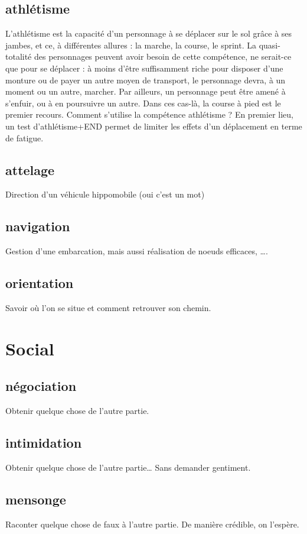 \documentclass[10pt,a4paper,twocolumn]{book}
\begin{document}
\subsection*{athlétisme}
L’athlétisme est la capacité d’un personnage à se déplacer sur le sol grâce à ses jambes, et ce, à différentes allures : la marche, la course, le sprint. La quasi-totalité des personnages peuvent avoir besoin de cette compétence, ne serait-ce que pour se déplacer : à moins d’être suffisamment riche pour disposer d’une monture ou de payer un autre moyen de transport, le personnage devra, à un moment ou un autre, marcher. Par ailleurs, un personnage peut être amené à s’enfuir, ou à en poursuivre un autre. Dans ces cas-là, la course à pied est le premier recours.
Comment s’utilise la compétence athlétisme ?
En premier lieu, un test d’athlétisme+END permet de limiter les effets d’un déplacement en terme de fatigue.

\subsection*{attelage}
Direction d’un véhicule hippomobile (oui c’est un mot)
\subsection*{navigation}
Gestion d’une embarcation, mais aussi réalisation de noeuds efficaces, ….
\subsection*{orientation}
Savoir où l’on se situe et comment retrouver son chemin.
\section{Social}
\subsection*{négociation}
Obtenir quelque chose de l’autre partie.
\subsection*{intimidation}
Obtenir quelque chose de l’autre partie… Sans demander gentiment.
\subsection*{mensonge}
Raconter quelque chose de faux à l’autre partie. De manière crédible, on l’espère.
\end{document}
